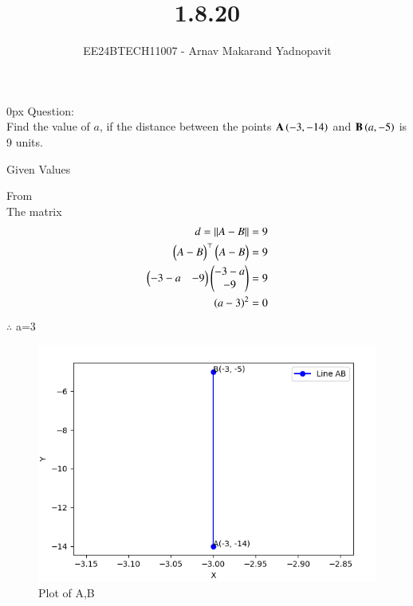 \documentclass[journal]{IEEEtran}
\begin{document}

\title{1.8.20}
\author{EE24BTECH11007 - Arnav Makarand Yadnopavit}
{\let\newpage\relax\maketitle}
\renewcommand{\thefigure}{\theenumi}
\renewcommand{\thetable}{\theenumi}
\setlength{\intextsep}{10pt} %
\renewcommand{\thetable}{\theenumi}
\parindent 0px
Question:\\
Find the value of $a$, if the distance between the points $\mathbf{A}\left(-3,-14\right)$ and $\mathbf{B}\left(a,-5\right)$ is 9 units.\\
\solution
\begin{table}[h]
    \centering
    
    \caption{Given Values}
    \label{tab:1}
\end{table}
From \\
The matrix
\begin{align}
d = \left\lVert A-B\right\rVert=9\\
\begin{pmatrix}A-B\end{pmatrix}^\top\begin{pmatrix}A-B\end{pmatrix}=9\\
\begin{pmatrix}-3-a & -9\end{pmatrix}\begin{pmatrix}-3-a \\ -9\end{pmatrix}=9\\
\left(a-3\right)^2=0
\end{align}
$\therefore$ a=3
\begin{figure}[h]
    \centering
    \includegraphics[width=\columnwidth]{figs/fig.png}
    \caption{Plot of A,B}
 \end{figure}
\end{document}
